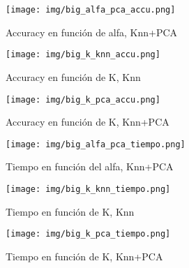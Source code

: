 \documentclass[a4paper]{article}
\begin{document}


\begin{figure}[H] 
\centering
\texttt{[image: img/big\_alfa\_pca\_accu.png]}
\caption{Accuracy en función de alfa, Knn+PCA}
\label{fig:big_alfa_pca_accu}
\end{figure}



\begin{figure}[H] 
\centering
\texttt{[image: img/big\_k\_knn\_accu.png]}
\caption{Accuracy en función de K, Knn}
\label{fig:big_k_knn_accu}
\end{figure}

\begin{figure}[H] 
\centering
\texttt{[image: img/big\_k\_pca\_accu.png]}
\caption{Accuracy en función de K, Knn+PCA}
\label{fig:big_k_pca_accu}
\end{figure}


\begin{figure}[H] 
\centering
\texttt{[image: img/big\_alfa\_pca\_tiempo.png]}
\caption{Tiempo en función del alfa, Knn+PCA}
\label{fig:big_alfa_pca_tiempo}
\end{figure}


\begin{figure}[H] 
\centering
\texttt{[image: img/big\_k\_knn\_tiempo.png]}
\caption{Tiempo en función de K, Knn}
\label{fig:big_k_knn_tiempo}
\end{figure}

\begin{figure}[H] 
\centering
\texttt{[image: img/big\_k\_pca\_tiempo.png]}
\caption{Tiempo en función de K, Knn+PCA}
\label{fig:big_k_pca_tiempo}
\end{figure}
\end{document}
